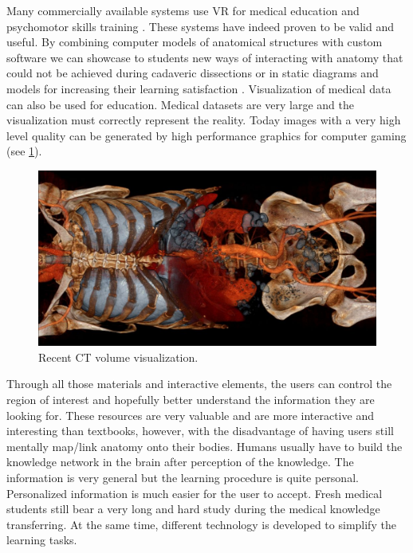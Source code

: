 Many commercially available systems use VR for medical education and psychomotor skills training \cite{Lu2005,Basdogan2007}. These systems have indeed proven to be valid and useful.
By combining computer models of anatomical structures with custom software we can showcase to students new ways of interacting with anatomy that could not be achieved during cadaveric dissections or in static diagrams and models for increasing their learning satisfaction \cite{Bacca2014}. 
Visualization of medical data can also be used for education. Medical datasets are very large and the visualization must correctly represent the reality. Today images with a very high level quality can be generated by high performance graphics for computer gaming (see \figurename{\ref{fig:2-bg:CTRendering}}).  
\begin{figure}
\centering  %
\includegraphics[width=0.8\linewidth]{figures/2-bg/CTRendering}
\caption{Recent CT volume visualization.}
\label{fig:2-bg:CTRendering}
\end{figure}

Through all those materials and interactive elements, the users can control the region of interest and hopefully better understand the information they are looking for. 
These resources are very valuable and are more interactive and interesting than textbooks, however, with the disadvantage of having users still mentally map/link anatomy onto their bodies.
Humans usually have to build the knowledge network in the brain after perception of the knowledge. The information is very general but the learning procedure is quite personal. Personalized information is much easier for the user to accept.
Fresh medical students still bear a very long and hard study during the medical knowledge transferring.
At the same time, different technology is developed to simplify the learning tasks.

